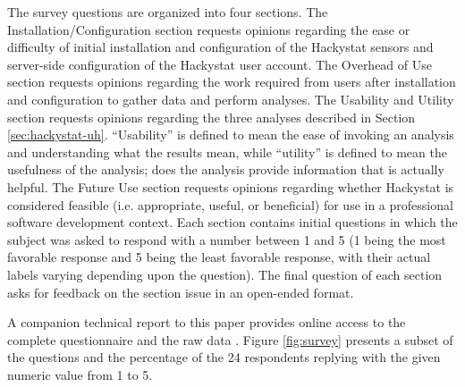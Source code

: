 \documentclass[10pt,twocolumn]{article}
\begin{document}
The survey questions are organized into four sections.  The
Installation/Configuration section requests opinions regarding the ease or
difficulty of initial installation and configuration of the Hackystat
sensors and server-side configuration of the Hackystat user account.  The
Overhead of Use section requests opinions regarding the work required from
users after installation and configuration to gather data and perform
analyses. The Usability and Utility section requests opinions regarding the
three analyses described in Section \ref{sec:hackystat-uh}.  ``Usability''
is defined to mean the ease of invoking an analysis and understanding what
the results mean, while ``utility'' is defined to mean the usefulness of
the analysis; does the analysis provide information that is actually
helpful. The Future Use section requests opinions regarding
whether Hackystat is considered feasible (i.e. appropriate, useful, or
beneficial) for use in a professional software development context. Each
section contains initial questions in which the subject was asked to
respond with a number between 1 and 5 (1 being the most favorable
response and 5 being the least favorable response, with their actual labels
varying depending upon the question).  The final question of each section
asks for feedback on the section issue in an open-ended format.

A companion technical report to this paper provides online access to the
complete questionnaire and the raw data \cite{csdl2-03-13}.  Figure
\ref{fig:survey} presents a subset of the questions and the percentage of
the 24 respondents replying with the given numeric value from 1 to 5.
\end{document}
